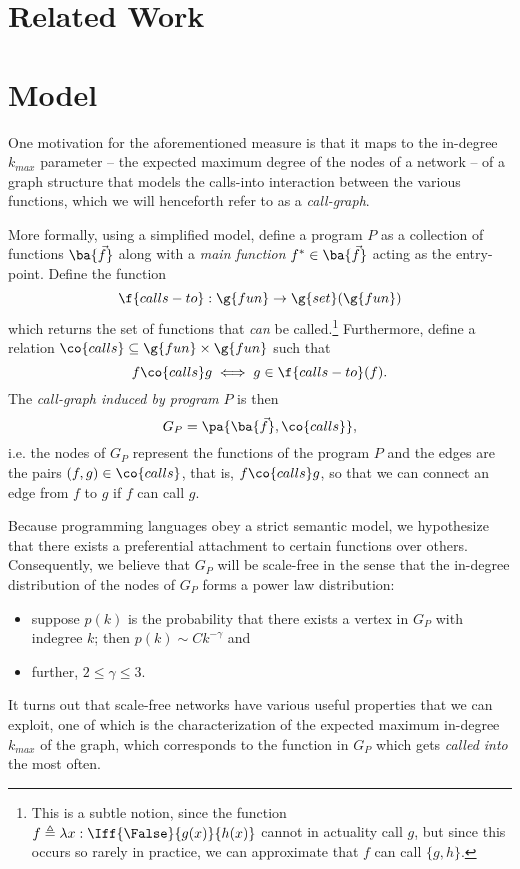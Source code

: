 \documentclass[11pt,a4paper,twocolumn]{article}
\begin{document}
\begin{singlespace}
\section{Related Work}

\section{Model}

One motivation for the aforementioned measure is that it maps to the in-degree
$k_{max}$ parameter -- the expected maximum degree of the nodes of a network --
of a graph structure that models the calls-into interaction between the various
functions, which we will henceforth refer to as a \emph{call-graph}.

More formally, using a simplified model, define a program $P$ as a collection
of functions $\ba{\vec{f}}$ along with a \emph{main function}
$f^{\ast}\in\ba{\vec{f}}$ acting as the entry-point. Define the function
\[\f{calls-to}:\g{fun}\to\g{set}(\g{fun})\]
which returns the set of functions that \emph{can} be called.\footnote{This is
a subtle notion, since the function $f\triangleq\lambda x: \Iff{\False}{g(x)}
{h(x)}$ cannot in actuality call $g$, but since this occurs so rarely in
practice, we can approximate that $f$ can call $\{g,h\}$.} Furthermore, define
a relation $\co{calls}\subseteq\g{fun}\times\g{fun}$ such that
\[f\co{calls} g \iff g \in \f{calls-to}(f).\]
The \emph{call-graph induced by program} $P$ is then
\[G_P=\pa{\ba{\vec{f}},\co{calls}},\]
i.e. the nodes of $G_P$ represent the functions of the program $P$ and the
edges are the pairs $(f,g)\in\co{calls}$, that is, $f\co{calls} g$, so that
we can connect an edge from $f$ to $g$ if $f$ can call $g$.

Because programming languages obey a strict semantic model, we hypothesize that
there exists a preferential attachment to certain functions over others.
Consequently, we believe that $G_P$ will be scale-free in the sense that
the in-degree distribution of the nodes of $G_P$ forms a power law
distribution:\cite{DUR}
\begin{itemize}
\item suppose $p(k)$ is the probability that there exists a vertex in $G_P$
with indegree $k$; then $p(k)\sim Ck^{-\gamma}$ and
\item further, $2\leq\gamma\leq 3$.
\end{itemize}

It turns out that scale-free networks have various useful properties that we
can exploit, one of which is the characterization of the expected maximum
in-degree $k_{max}$ of the graph, which corresponds to the function in $G_P$
which gets \emph{called into} the most often.


\end{singlespace}
\end{document}
